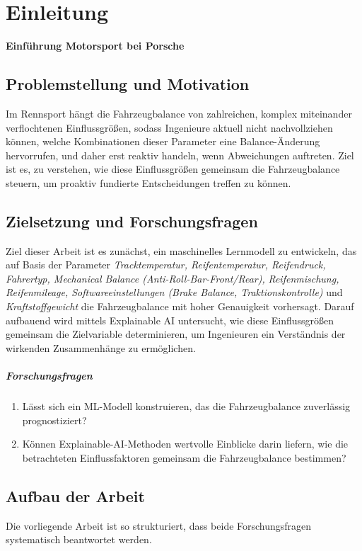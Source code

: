\chapter{Einleitung}

\textbf{Einführung Motorsport bei Porsche}

\section{Problemstellung und Motivation}
Im Rennsport hängt die Fahrzeugbalance von zahlreichen, komplex miteinander verflochtenen Einflussgrößen, sodass Ingenieure aktuell nicht nachvollziehen können, welche Kombinationen dieser Parameter eine Balance-Änderung hervorrufen, und daher erst reaktiv handeln, wenn Abweichungen auftreten. Ziel ist es, zu verstehen, wie diese Einflussgrößen gemeinsam die Fahrzeugbalance steuern, um proaktiv fundierte Entscheidungen treffen zu können.

\section{Zielsetzung und Forschungsfragen}

Ziel dieser Arbeit ist es zunächst, ein maschinelles Lernmodell zu entwickeln, das auf Basis der Parameter  
\textit{Tracktemperatur, Reifentemperatur, Reifendruck, Fahrertyp, Mechanical Balance (Anti-Roll-Bar-Front/Rear),}  
\textit{Reifenmischung, Reifenmileage, Softwareeinstellungen (Brake Balance, Traktionskontrolle)} und  
\textit{Kraftstoffgewicht} die Fahrzeugbalance mit hoher Genauigkeit vorhersagt. Darauf aufbauend wird  
mittels Explainable AI untersucht, wie diese Einflussgrößen gemeinsam die Zielvariable determinieren,  
um Ingenieuren ein Verständnis der wirkenden Zusammenhänge zu ermöglichen.

\paragraph{Forschungsfragen}
\begin{enumerate}
  \item Lässt sich ein ML-Modell konstruieren, das die Fahrzeugbalance zuverlässig prognostiziert?
  \item Können Explainable-AI-Methoden wertvolle Einblicke darin liefern, wie die betrachteten Einflussfaktoren gemeinsam die Fahrzeugbalance bestimmen?
\end{enumerate}


\section{Aufbau der Arbeit}
Die vorliegende Arbeit ist so strukturiert, dass beide Forschungsfragen systematisch beantwortet werden. 

